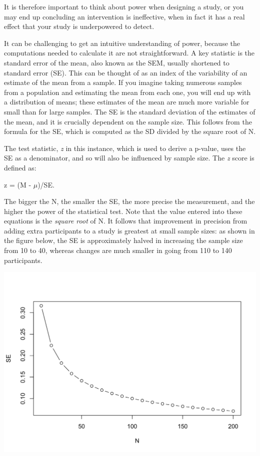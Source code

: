 \documentclass{krantz}
\begin{document}
It is therefore important to think about power when designing a study, or you may end up concluding an intervention is ineffective, when in fact it has a real effect that your study is underpowered to detect.

\begin{tcolorbox}[enhanced,colback=Black!5!lightgray,colframe=black!75!black,coltitle=white,title=Standard Error of the Mean]
It can be challenging to get an intuitive understanding of power, because the computations needed to calculate it are not straightforward. A key statistic is the standard error of the mean, also known as the SEM, usually shortened to standard error (SE). This can be thought of as an index of the variability of an estimate of the mean from a sample. If you imagine taking numerous samples from a population and estimating the mean from each one, you will end up with a distribution of means; these estimates of the mean are much more variable for small than for large samples. The SE is the standard deviation of the estimates of the mean, and it is crucially dependent on the sample size.
This follows from the formula for the SE, which is computed as the SD divided by the square root of N.

The test statistic, \emph{z} in this instance, which is used to derive a p-value, uses the SE as a denominator, and so will also be influenced by sample size. The \emph{z} score is defined as:

z = (M - \(\mu\))/SE.

The bigger the N, the smaller the SE, the more precise the measurement, and the higher the power of the statistical test. Note that the value entered into these equations is the \emph{square root} of N. It follows that improvement in precision from adding extra participants to a study is greatest at small sample sizes: as shown in the figure below, the SE is approximately halved in increasing the sample size from 10 to 40, whereas changes are much smaller in going from 110 to 140 participants.

\includegraphics[width=0.6\linewidth]{images_bw/demoSE}\label{SEMbyN}
\end{tcolorbox}
\end{document}
